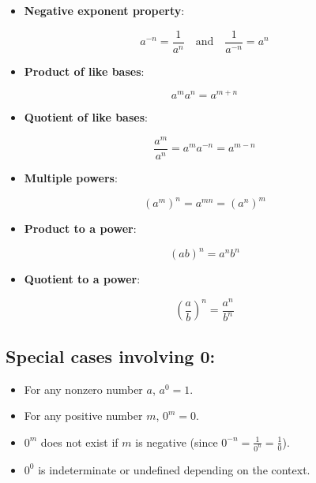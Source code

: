 \begin{itemize}
    \item \textbf{Negative exponent property}:
\end{itemize}
  \[
a^{-n} = \frac{1}{a^n} \quad \text{and} \quad \frac{1}{a^{-n}} = a^n
\]

\begin{itemize}
    \item \textbf{Product of like bases}:
\end{itemize}
  \[
a^m a^n = a^{m+n}
\]

\begin{itemize}
    \item \textbf{Quotient of like bases}:
\end{itemize}
  \[
\frac{a^m}{a^n} = a^m a^{-n} = a^{m-n}
\]

\begin{itemize}
    \item \textbf{Multiple powers}:
\end{itemize}
  \[
(a^m)^n = a^{mn} = (a^n)^m
\]

\begin{itemize}
    \item \textbf{Product to a power}:
\end{itemize}
  \[
(ab)^n = a^n b^n
\]

\begin{itemize}
    \item \textbf{Quotient to a power}:
\end{itemize}
  \[
\left(\frac{a}{b}\right)^n = \frac{a^n}{b^n}
\]

\subsection{Special cases involving 0:}
\label{sss:spec-4783}

\begin{itemize}
    \item For any nonzero number $a$, $a^0 = 1$.
    \item For any positive number $m$, $0^m = 0$.
    \item $0^m$ does not exist if $m$ is negative (since $0^{-n} = \frac{1}{0^n} = \frac{1}{0}$).
    \item $0^0$ is indeterminate or undefined depending on the context.
\end{itemize}

